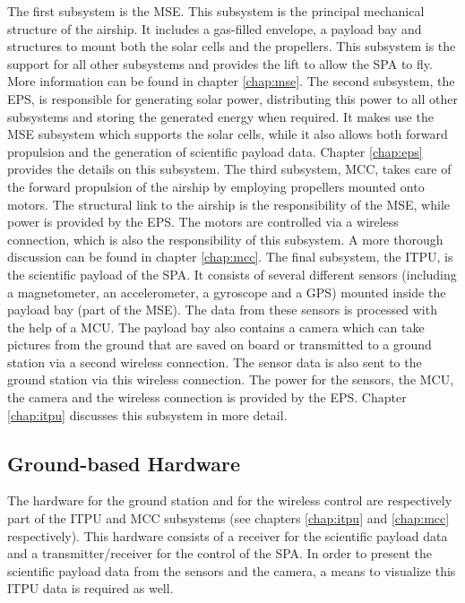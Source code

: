 The first subsystem is the \ac{MSE}. This subsystem is the principal mechanical structure of the airship. It includes a gas-filled envelope, a payload bay and structures to mount both the solar cells and the propellers. This subsystem is the support for all other subsystems and provides the lift to allow the \ac{SPA} to fly. More information can be found in chapter \ref{chap:mse}. The second subsystem, the \ac{EPS}, is responsible for generating solar power, distributing this power to all other subsystems and storing the generated energy when required. It makes use the \ac{MSE} subsystem which supports the solar cells, while it also allows both forward propulsion and the generation of scientific payload data.  Chapter \ref{chap:eps} provides the details on this subsystem. The third subsystem, \ac{MCC}, takes care of the forward propulsion of the airship by employing propellers mounted onto motors. The structural link to the airship is the responsibility of the \ac{MSE}, while power is provided by the \ac{EPS}. The motors are controlled via a wireless connection, which is also the responsibility of this subsystem. A more thorough discussion can be found in chapter \ref{chap:mcc}. The final subsystem, the \ac{ITPU}, is the scientific payload of the \ac{SPA}. It consists of several different sensors (including a magnetometer, an accelerometer, a gyroscope and a \ac{GPS}) mounted inside the payload bay (part of the \ac{MSE}). The data from these sensors is processed with the help of a \ac{MCU}. The payload bay also contains a camera which can take pictures from the ground that are saved on board or transmitted to a ground station via a second wireless connection. The sensor data is also sent to the ground station via this wireless connection. The power for the sensors, the \ac{MCU}, the camera and the wireless connection is provided by the \ac{EPS}. Chapter \ref{chap:itpu} discusses this subsystem in more detail.

\subsection{Ground-based Hardware}

The hardware for the ground station and for the wireless control are respectively part of the \ac{ITPU} and \ac{MCC} subsystems (see chapters \ref{chap:itpu} and \ref{chap:mcc} respectively).  This hardware consists of a receiver for the scientific payload data and a transmitter/receiver for the control of the \ac{SPA}.  In order to present the scientific payload data from the sensors and the camera, a means to visualize this \ac{ITPU} data is required as well.

